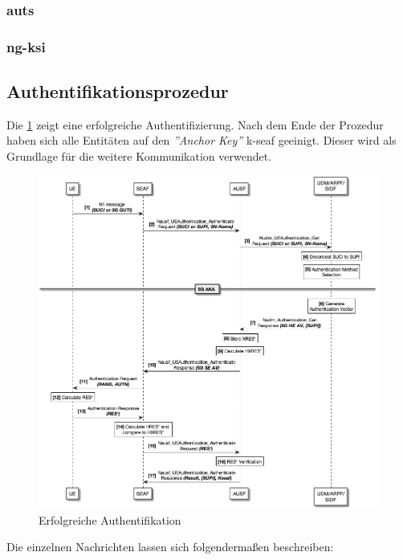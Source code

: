 \subsubsection{\gls{auts}}

\subsubsection{\gls{ng-ksi}}


\subsection{Authentifikationsprozedur}

Die \cref{fig:protocol_v1} zeigt eine erfolgreiche Authentifizierung.
Nach dem Ende der Prozedur haben sich alle Entit\"aten auf den \textit{''Anchor Key''} \gls{k-seaf} geeinigt.
Dieser wird als Grundlage f\"ur die weitere Kommunikation verwendet.

\begin{figure}[H]
  \centering
  \includegraphics[width=\textwidth]{uml/protocol_v1.png}
  \caption{Erfolgreiche Authentifikation}
  \label{fig:protocol_v1}
\end{figure}

Die einzelnen Nachrichten lassen sich folgenderma{\ss}en beschreiben: %

